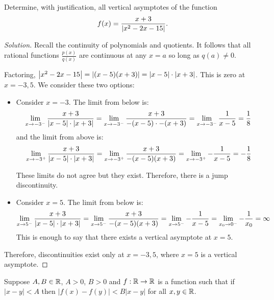 \question Determine, with justification, all vertical asymptotes of the function
\[ f(x) = \frac{x+3}{\abs{x^2-2x-15}}. \]
\begin{proof}[Solution]
  Recall the continuity of polynomials and quotients.
  It follows that all rational functions $\frac{p(x)}{q(x)}$ are continuous at any $x=a$ so long as $q(a)\neq 0$.

  Factoring, $\abs{x^2-2x-15}=\abs{(x-5)(x+3)}=\abs{x-5}\cdot\abs{x+3}$.
  This is zero at $x=-3,5$.
  We consider these two options:
  \begin{itemize}
    \item Consider $x=-3$. The limit from below is:
          \begin{equation*}
            \displaystyle\lim_{x\to-3^-} \frac{x+3}{\abs{x-5}\cdot\abs{x+3}}
            = \displaystyle\lim_{x\to-3^-} \frac{x+3}{-(x-5)\cdot-(x+3)}
            = \displaystyle\lim_{x\to-3^-} \frac{1}{x-5}
            = \frac{1}{8}
          \end{equation*}
          and the limit from above is:
          \begin{equation*}
            \displaystyle\lim_{x\to-3^+} \frac{x+3}{\abs{x-5}\cdot\abs{x+3}}
            = \displaystyle\lim_{x\to-3^+} \frac{x+3}{-(x-5)(x+3)}
            = \displaystyle\lim_{x\to-3^+} -\frac{1}{x-5}
            = -\frac{1}{8}
          \end{equation*}

          These limits do not agree but they exist.
          Therefore, there is a jump discontinuity.
    \item Consider $x=5$. The limit from below is:
          \begin{equation*}
            \displaystyle\lim_{x\to5^-} \frac{x+3}{\abs{x-5}\cdot\abs{x+3}}
            = \displaystyle\lim_{x\to5^-} \frac{x+3}{-(x-5)(x+3)}
            = \displaystyle\lim_{x\to5^-} -\frac{1}{x-5}
            = \displaystyle\lim_{x_0\to0^-} -\frac{1}{x_0}
            = \infty
          \end{equation*}
          This is enough to say that there exists a vertical asymptote at $x=5$.
  \end{itemize}

  Therefore, discontinuities exist only at $x=-3,5$, where $x=5$ is a vertical asymptote.
\end{proof}

\question Suppose $A,B \in \mathbb{R}$, $A>0$, $B>0$ and $f:\mathbb{R}\to\mathbb{R}$ is a function such that
if $|x-y| < A$ then $|f(x)-f(y)| < B|x-y|$ for all $x,y\in\mathbb{R}$.

